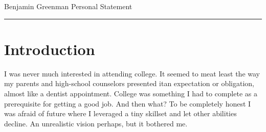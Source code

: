 \documentclass{article}
\renewcommand{\maketitle}{\textsf{\large Benjamin Greenman \hfill{} Personal Statement}\\ \hrule}
\begin{document}
\newcommand{\phd}{Ph.D.}
\newcommand{\university}{%
\texttt{<your-college-here>}
}


\newcommand{\sloc}{13.6 million lines}
\newcommand{\numprojects}{43}

\vspace{-2cm}

\maketitle





\section{Introduction}
I was never much interested in attending college.
It seemed to me\textemdash at least the way my parents and high-school counselors presented it\textemdash an expectation or obligation, almost like a dentist appointment. 
College was something I had to complete as a prerequisite for getting a good job.
And then what? 
To be completely honest I was afraid of future where I leveraged a tiny skillset and let other abilities decline. 
An unrealistic vision perhaps, but it bothered me. 
\end{document}
